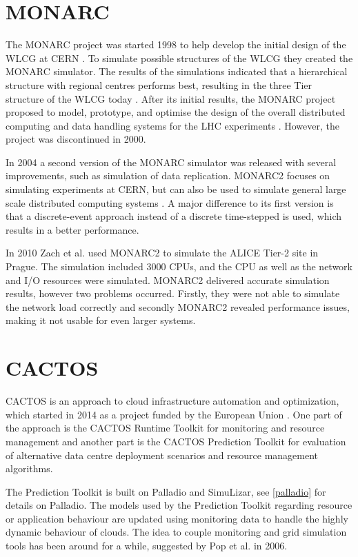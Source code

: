 \section{MONARC}
The MONARC project was started 1998 to help develop the initial design of the WLCG at CERN \cite{monarc2000models}.
To simulate possible structures of the WLCG they created the MONARC simulator.
The results of the simulations indicated that a hierarchical structure with regional centres performs best, resulting in the three Tier structure of the WLCG today \cite{morita2001validation}. 
After its initial results, the MONARC project proposed to model, prototype, and optimise the design of the overall distributed computing and data handling systems for the LHC experiments \cite{monarc2000models}.
However, the project was discontinued in 2000.

In 2004 a second version of the MONARC simulator was released with several improvements, such as simulation of data replication. MONARC2 focuses on simulating experiments at CERN, but can also be used to simulate general large scale distributed computing systems \cite{legrand2003monarc}. A major difference to its first version is that a discrete-event approach instead of a discrete time-stepped is used, which results in a better performance.

In 2010 Zach et al. \cite{1742-6596-331-7-072038} used MONARC2 to simulate the ALICE Tier-2 site in Prague. The simulation included 3000 CPUs, and the CPU as well as the network and I/O resources were simulated. MONARC2 delivered accurate simulation results, however two problems occurred. Firstly, they were not able to simulate the network load correctly and secondly MONARC2 revealed performance issues, making it not usable for even larger systems.
\newpage
\section{CACTOS}
CACTOS is an approach to cloud infrastructure automation and optimization, which started in 2014 as a project funded by the European Union \cite{cactos}.
One part of the approach is the CACTOS Runtime Toolkit for monitoring and resource management and another part is the CACTOS Prediction Toolkit for evaluation of alternative data centre deployment scenarios and resource management algorithms.

The Prediction Toolkit is built on Palladio and SimuLizar, see \cref{palladio} for details on Palladio.
The models used by the Prediction Toolkit regarding resource or application behaviour are updated using monitoring data to handle the highly dynamic behaviour of clouds.
The idea to couple monitoring and grid simulation tools has been around for a while, suggested by Pop et al. \cite{1698650} in 2006.

